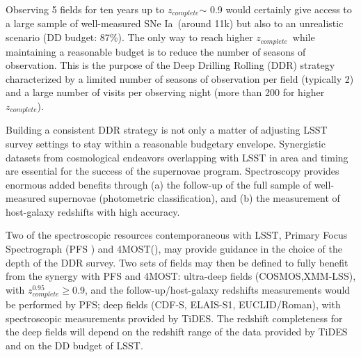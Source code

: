 \documentclass[\docopts]{\docclass}
\newcommand{\cosmos}{{\sc COSMOS}}
\newcommand{\elais}{{\sc ELAIS-S1}}
\newcommand{\xmm}{{\sc XMM-LSS}}
\newcommand{\cdfs}{{\sc CDF-S}}
\newcommand{\adfs}{{\sc EUCLID/Roman}}
\newcommand{\sne}{{SNe Ia}}
\newcommand{\zcomp}{\mbox{$z_{complete}$}}
\newcommand{\zcompb}{\mbox{$z_{complete}^{0.95}$}}
\begin{document}
Observing 5 fields for ten years up to \zcomp $\sim$ 0.9 would certainly give access to a large sample of well-measured \sne~(around 11k) but also to an unrealistic scenario (DD budget: 87\%). The only way to reach higher \zcomp~while maintaining a reasonable budget is to reduce the number of seasons of observation. This is the purpose of the Deep Drilling Rolling (DDR) strategy characterized by a limited number of seasons of observation per field (typically 2) and a large number of visits per observing night (more than 200 for higher \zcomp).

\par
Building a consistent DDR strategy is not only a matter of adjusting LSST survey settings to stay within a reasonable budgetary envelope. Synergistic datasets from cosmological endeavors overlapping with LSST in area and timing are essential for the success of the supernovae program. Spectroscopy provides enormous added benefits through (a) the follow-up of the full sample of well-measured supernovae (photometric classification), and (b) the measurement of host-galaxy redshifts with high accuracy.
\par
Two of the spectroscopic resources contemporaneous with LSST, Primary Focus Spectrograph (PFS \cite{Tamura_2016}) and 4MOST(\cite{}), may provide guidance in the choice of the depth of the DDR survey. Two sets of fields may then be defined to fully benefit from the synergy with PFS and 4MOST: ultra-deep fields (\cosmos,\xmm), with \zcompb$\geq$0.9, and the follow-up/host-galaxy redshifts measurements would be performed by PFS; deep fields (\cdfs, \elais, \adfs), with spectroscopic measurements provided by TiDES. The redshift completeness for the deep fields will depend on the redshift range of the data provided by TiDES and on the DD budget of LSST. 
\end{document}
